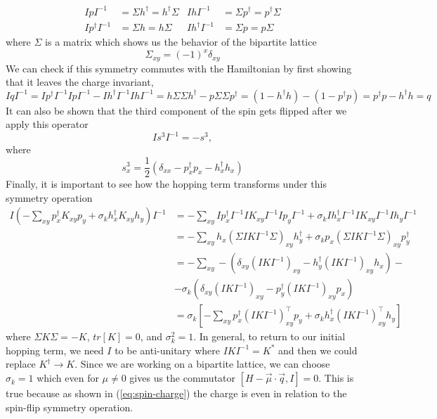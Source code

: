 \begin{align*}
  IpI^{-1} &= \Sigma h^\dagger = h^\dagger \Sigma & IhI^{-1} &= \Sigma p^\dagger = p^\dagger \Sigma \\
  Ip^\dagger I^{-1} &= \Sigma h = h \Sigma & Ih^\dagger I^{-1} &= \Sigma p = p \Sigma
\end{align*}
where $\Sigma$ is a matrix which shows us the behavior of the bipartite lattice
\begin{equation}
  \Sigma_{xy} = (-1)^x\delta_{xy}
\end{equation}
We can check if this symmetry commutes with the Hamiltonian by first showing that it leaves the charge invariant,
\begin{equation}
  IqI^{-1} = Ip^\dagger I^{-1}IpI^{-1} - Ih^\dagger I^{-1}IhI^{-1} = h\Sigma\Sigma h^\dagger - p\Sigma\Sigma p^\dagger = (1 - h^\dagger h) - (1 - p^\dagger p) = p^\dagger p - h^\dagger h = q
  \label{eq:spin-charge}
\end{equation}
It can also be shown that the third component of the spin gets flipped after we apply this operator
\begin{equation}
  Is^3I^{-1} = -s^3,
\end{equation}
where
\begin{equation}
  s^3_x = \frac{1}{2}\left(\delta_{xx} - p^\dagger_x p_x - h^\dagger_x h_x\right)
\end{equation}
Finally, it is important to see how the hopping term transforms under this symmetry operation
\begin{align*}
  I\left( -\sum_{xy} p^\dagger_x K_{xy} p_y + \sigma_k h^\dagger_x K_{xy} h_y\right) I^{-1} &= -\sum_{xy} I p^\dagger_x I^{-1}I K_{xy} I^{-1}I p_y I^{-1} + \sigma_k I h^\dagger_x I^{-1}I K_{xy} I^{-1}I h_y I^{-1}
  \\
  &= -\sum_{xy}  h_x (\Sigma I K I^{-1}\Sigma)_{xy} h^\dagger_y + \sigma_k p_x (\Sigma I K I^{-1}\Sigma)_{xy} p^\dagger_y
  \\
  &= -\sum_{xy} -(\delta_{xy} (I K I^{-1})_{xy} - h^\dagger_y (I K I^{-1})_{xy} h_x) -
  \\
  &- \sigma_k (\delta_{xy} (I K I^{-1})_{xy} - p^\dagger_y (I K I^{-1})_{xy} p_x)
  \\
  &= \sigma_k \left[-\sum_{xy} p^\dagger_x (I K I^{-1})^\top_{xy} p_y + \sigma_k h^\dagger_x (I K I^{-1})^\top_{xy} h_y \right]
\end{align*}
where $\Sigma K \Sigma = -K$, $tr[K] = 0$, and $\sigma^2_k = 1$. In general, to return to our initial hopping term, we need $I$ to be anti-unitary where $IKI^{-1} = K^*$ and then we could replace $K^\dagger\rightarrow K$. Since we are working on a bipartite lattice, we can choose $\sigma_k = 1$ which even for $\mu \neq 0$ gives us the commutator $[H - \vec{\mu}\cdot\vec{q}, I] = 0$. This is true because as shown in (\ref{eq:spin-charge}) the charge is even in relation to the spin-flip symmetry operation.

